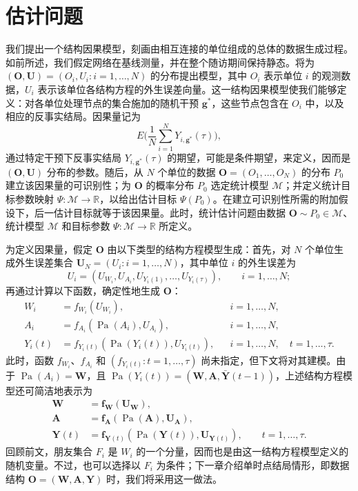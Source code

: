 \section{估计问题}

我们提出一个结构因果模型，刻画由相互连接的单位组成的总体的数据生成过程。如前所述，我们假定网络在基线测量，并在整个随访期间保持静态。将为 $(\mathbf O,\mathbf U)=(O_i,U_i:i=1,\ldots,N)$ 的分布提出模型，其中 $O_i$ 表示单位 $i$ 的观测数据，$U_i$ 表示该单位各结构方程的外生误差向量。这一结构因果模型使我们能够定义：对各单位处理节点的集合施加的随机干预 $\mathbf g^*$，这些节点包含在 $O_i$ 中，以及相应的反事实结局。因果量记为
\[
 E\biggl(\frac1N\sum_{i=1}^NY_{i,\mathbf g^*}(\tau)\biggr),
\]
通过特定干预下反事实结局 $Y_{i,\mathbf g^*}(\tau)$ 的期望，可能是条件期望，来定义，因而是 $(\mathbf O,\mathbf U)$ 分布的参数。随后，从 $N$ 个单位的数据 $\mathbf O=(O_1,\ldots,O_N)$ 的分布 $P_0$ 建立该因果量的可识别性；为 $\mathbf O$ 的概率分布 $P_0$ 选定统计模型 $\mathcal M$；并定义统计目标参数映射 $\Psi:\mathcal M\to\mathbb R$，以给出估计目标 $\Psi(P_0)$。在建立可识别性所需的附加假设下，后一估计目标就等于该因果量。此时，统计估计问题由数据 $\mathbf O\sim P_0\in\mathcal M$、统计模型 $\mathcal M$ 和目标参数 $\Psi:\mathcal M\to\mathbb R$ 所定义。

为定义因果量，假定 $\mathbf O$ 由以下类型的结构方程模型生成：首先，对 $N$ 个单位生成外生误差集合 $\mathbf U_N=(U_i:i=1,\ldots,N)$，其中单位 $i$ 的外生误差为
\[
 U_i=(U_{W_i},U_{A_i},U_{Y_i(1)},\ldots,U_{Y_i(\tau)}),\qquad i=1,\ldots,N;
\]
再通过计算以下函数，确定性地生成 $\mathbf O$：
\begin{equation}
\begin{aligned}
 W_i&=f_{W_i}(U_{W_i}),&&i=1,\ldots,N,\\
 A_i&=f_{A_i}(\operatorname{Pa}(A_i),U_{A_i}),&&i=1,\ldots,N,\\
 Y_i(t)&=f_{Y_i(t)}(\operatorname{Pa}(Y_i(t)),U_{Y_i(t)}),
 &&i=1,\ldots,N,\quad t=1,\ldots,\tau.
\end{aligned}
\tag{20.1}
\end{equation}
此时，函数 $f_{W_i}$、$f_{A_i}$ 和 $(f_{Y_i(t)}:t=1,\ldots,\tau)$ 尚未指定，但下文将对其建模。由于 $\operatorname{Pa}(A_i)=\mathbf W$，且 $\operatorname{Pa}(Y_i(t))=(\mathbf W,\mathbf A,\bar{\mathbf Y}(t-1))$，上述结构方程模型还可简洁地表示为
\begin{equation}
\begin{aligned}
 \mathbf W&=\mathbf f_{\mathbf W}(\mathbf U_{\mathbf W}),\\
 \mathbf A&=\mathbf f_{\mathbf A}(\operatorname{Pa}(\mathbf A),\mathbf U_{\mathbf A}),\\
 \mathbf Y(t)&=\mathbf f_{\mathbf Y(t)}(\operatorname{Pa}(\mathbf Y(t)),\mathbf U_{\mathbf Y(t)}),
 \qquad t=1,\ldots,\tau.
\end{aligned}
\tag{20.2}
\end{equation}
回顾前文，朋友集合 $F_i$ 是 $W_i$ 的一个分量，因而也是由这一结构方程模型定义的随机变量。不过，也可以选择以 $F_i$ 为条件；下一章介绍单时点结局情形，即数据结构 $\mathbf O=(\mathbf W,\mathbf A,\mathbf Y)$ 时，我们将采用这一做法。


